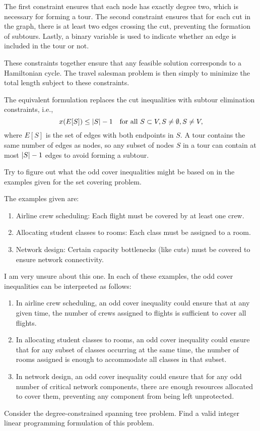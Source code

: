 \begin{solution}
  The first constraint ensures that each node has exactly degree two, which is necessary for forming a tour.
  The second constraint ensures that for each cut in the graph, there is at least two edges crossing the cut, preventing the formation of subtours.
  Lastly, a binary variable is used to indicate whether an edge is included in the tour or not.

  These constraints together ensure that any feasible solution corresponds to a Hamiltonian cycle.
  The travel salesman problem is then simply to minimize the total length subject to these constraints.

  The equivalent formulation replaces the cut inequalities with subtour elimination constraints, i.e.,
  \begin{equation}
    x(E[S]) \leq \lvert S\rvert - 1 \quad \text{for all } S \subset V, S \neq \emptyset, S \neq V,
  \end{equation}
  where $E[S]$ is the set of edges with both endpoints in $S$.
  A tour contains the same number of edges as nodes, so any subset of nodes $S$ in a tour can contain at most $\lvert S\rvert - 1$ edges to avoid forming a subtour.
\end{solution}

\begin{exercise}
  Try to figure out what the odd cover inequalities might be based on in the examples given for the set covering problem.
\end{exercise}

\begin{solution}
  The examples given are:
  \begin{enumerate}
    \item Airline crew scheduling: Each flight must be covered by at least one crew.
    \item Allocating student classes to rooms: Each class must be assigned to a room.
    \item Network design: Certain capacity bottlenecks (like cuts) must be covered to ensure network connectivity.
  \end{enumerate}

  {\large I am very unsure about this one.}
  In each of these examples, the odd cover inequalities can be interpreted as follows:
  \begin{enumerate}
    \item In airline crew scheduling, an odd cover inequality could ensure that at any given time, the number of crews assigned to flights is sufficient to cover all flights.
    \item In allocating student classes to rooms, an odd cover inequality could ensure that for any subset of classes occurring at the same time, the number of rooms assigned is enough to accommodate all classes in that subset.
    \item In network design, an odd cover inequality could ensure that for any odd number of critical network components, there are enough resources allocated to cover them, preventing any component from being left unprotected.
  \end{enumerate}
\end{solution}

\begin{exercise}
  Consider the degree-constrained spanning tree problem.
  Find a valid integer linear programming formulation of this problem.
\end{exercise}
